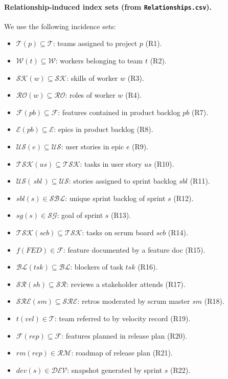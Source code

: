 \documentclass[11pt,a4paper]{article}
\begin{document}
\paragraph{Relationship-induced index sets (from \texttt{Relationships.csv}).} We use the following incidence sets:
\begin{itemize}[leftmargin=2em]
  \item $\mathcal{T}(p)\subseteq\mathcal{T}$: teams assigned to project $p$ (R1).
  \item $\mathcal{W}(t)\subseteq\mathcal{W}$: workers belonging to team $t$ (R2).
  \item $\mathcal{S\!K}(w)\subseteq\mathcal{S\!K}$: skills of worker $w$ (R3).
  \item $\mathcal{R\!O}(w)\subseteq\mathcal{R\!O}$: roles of worker $w$ (R4).
  \item $\mathcal{F}(pb)\subseteq\mathcal{F}$: features contained in product backlog $pb$ (R7).
  \item $\mathcal{E}(pb)\subseteq\mathcal{E}$: epics in product backlog (R8).
  \item $\mathcal{U\!S}(e)\subseteq\mathcal{U\!S}$: user stories in epic $e$ (R9).
  \item $\mathcal{T\!S\!K}(us)\subseteq\mathcal{T\!S\!K}$: tasks in user story $us$ (R10).
  \item $\mathcal{U\!S}(\,sbl\,)\subseteq\mathcal{U\!S}$: stories assigned to sprint backlog $sbl$ (R11).
  \item $sbl(s)\in\mathcal{S\!B\!L}$: unique sprint backlog of sprint $s$ (R12).
  \item $sg(s)\in\mathcal{S\!G}$: goal of sprint $s$ (R13).
  \item $\mathcal{T\!S\!K}(scb)\subseteq\mathcal{T\!S\!K}$: tasks on scrum board $scb$ (R14).
  \item $f(FED)\in\mathcal{F}$: feature documented by a feature doc (R15).
  \item $\mathcal{B\!L}(tsk)\subseteq\mathcal{B\!L}$: blockers of task $tsk$ (R16).
  \item $\mathcal{S\!R}(sh)\subseteq\mathcal{S\!R}$: reviews a stakeholder attends (R17).
  \item $\mathcal{S\!RE}(sm)\subseteq\mathcal{S\!RE}$: retros moderated by scrum master $sm$ (R18).
  \item $t(vel)\in\mathcal{T}$: team referred to by velocity record (R19).
  \item $\mathcal{F}(rep)\subseteq\mathcal{F}$: features planned in release plan (R20).
  \item $rm(rep)\in\mathcal{R\!M}$: roadmap of release plan (R21).
  \item $dev(s)\in\mathcal{D\!E\!V}$: snapshot generated by sprint $s$ (R22).
\end{itemize}
\end{document}
